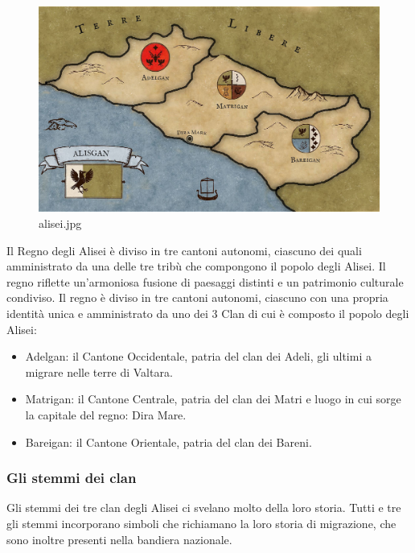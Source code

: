 \begin{figure}
\centering
\includegraphics{alisei.jpg}
\caption{alisei.jpg}
\end{figure}

Il Regno degli Alisei è diviso in tre cantoni autonomi, ciascuno dei
quali amministrato da una delle tre tribù che compongono il popolo degli
Alisei. Il regno riflette un'armoniosa fusione di paesaggi distinti e un
patrimonio culturale condiviso. Il regno è diviso in tre cantoni
autonomi, ciascuno con una propria identità unica e amministrato da uno
dei 3 Clan di cui è composto il popolo degli Alisei:

\begin{itemize}
\tightlist
\item
  Adelgan: il Cantone Occidentale, patria del clan dei Adeli, gli ultimi
  a migrare nelle terre di Valtara.
\item
  Matrigan: il Cantone Centrale, patria del clan dei Matri e luogo in
  cui sorge la capitale del regno: Dira Mare.
\item
  Bareigan: il Cantone Orientale, patria del clan dei Bareni.
\end{itemize}

\subsubsection{Gli stemmi dei clan}\label{gli-stemmi-dei-clan}

Gli stemmi dei tre clan degli Alisei ci svelano molto della loro storia.
Tutti e tre gli stemmi incorporano simboli che richiamano la loro storia
di migrazione, che sono inoltre presenti nella bandiera nazionale.

